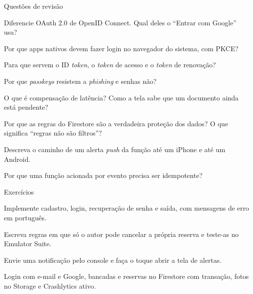 \documentclass[aspectratio=169,10pt]{beamer}
\begin{document}
\begin{frame}{Questões de revisão}
  \begin{questoes}
    \item Diferencie OAuth 2.0 de OpenID Connect. Qual deles o ``Entrar com Google'' usa?
    \item Por que apps nativos devem fazer login no navegador do sistema, com PKCE?
    \item Para que servem o ID \emph{token}, o \emph{token} de acesso e o \emph{token} de renovação?
    \item Por que \emph{passkeys} resistem a \emph{phishing} e senhas não?
    \item O que é compensação de latência? Como a tela sabe que um documento ainda está pendente?
    \item Por que as regras do Firestore são a verdadeira proteção dos dados? O que significa ``regras não são filtros''?
    \item Descreva o caminho de um alerta \emph{push} da função até um iPhone e até um Android.
    \item Por que uma função acionada por evento precisa ser idempotente?
  \end{questoes}
\end{frame}

\begin{frame}{Exercícios}
  \begin{exercicio}
    Implemente cadastro, login, recuperação de senha e saída, com mensagens de erro em português.
  \end{exercicio}
  \begin{exercicio}
    Escreva regras em que só o autor pode cancelar a própria reserva e teste-as no Emulator Suite.
  \end{exercicio}
  \begin{exercicio}
    Envie uma notificação pelo console e faça o toque abrir a tela de alertas.
  \end{exercicio}
  \begin{projeto}
    Login com e-mail e Google, bancadas e reservas no Firestore com transação, fotos no Storage e Crashlytics ativo.
  \end{projeto}
\end{frame}
\end{document}
